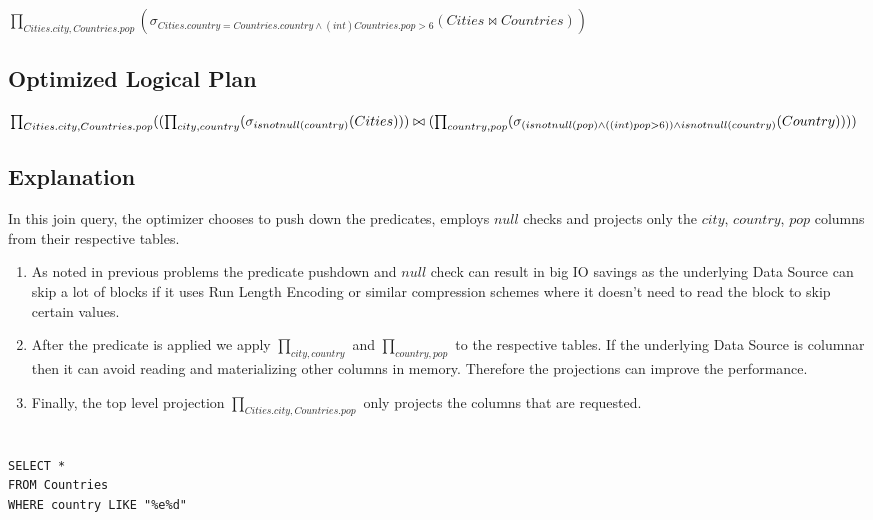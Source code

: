 \documentclass[12pt]{article}
\begin{document}
$\prod_{Cities.city, Countries.pop}(\sigma_{Cities.country = Countries.country \wedge (int) Countries.pop > 6}(Cities \bowtie Countries))$

\subsection*{Optimized Logical Plan}

$\prod_{Cities.city, Countries.pop}((\prod_{city, country}(\sigma_{isnotnull(country)}(Cities))) \bowtie \\
 (\prod_{country, pop}(\sigma_{(isnotnull(pop) \wedge ((int) pop > 6)) \wedge isnotnull(country)}(Country))))$


\subsection*{Explanation}

In this join query, the optimizer chooses to push down the predicates, employs $null$ checks and projects only the $city$, $country$, $pop$ columns from their respective tables.

\begin{enumerate}

\item As noted in previous problems the predicate pushdown and $null$ check can result in big IO savings as the underlying Data Source can skip a lot of blocks if it uses Run Length Encoding or similar compression schemes where it doesn't need to read the block to skip certain values.

\item After the predicate is applied we apply $\prod_{city, country}$ and $\prod_{country, pop}$ to the respective tables. If the underlying Data Source is columnar then it can avoid reading and materializing other columns in memory. Therefore the projections can improve the performance.

\item Finally, the top level projection $\prod_{Cities.city, Countries.pop}$ only projects the columns that are requested.

\end{enumerate}

\newpage

\section{}
\begin{verbatim}
SELECT *
FROM Countries
WHERE country LIKE "%e%d"
\end{verbatim}
\end{document}
